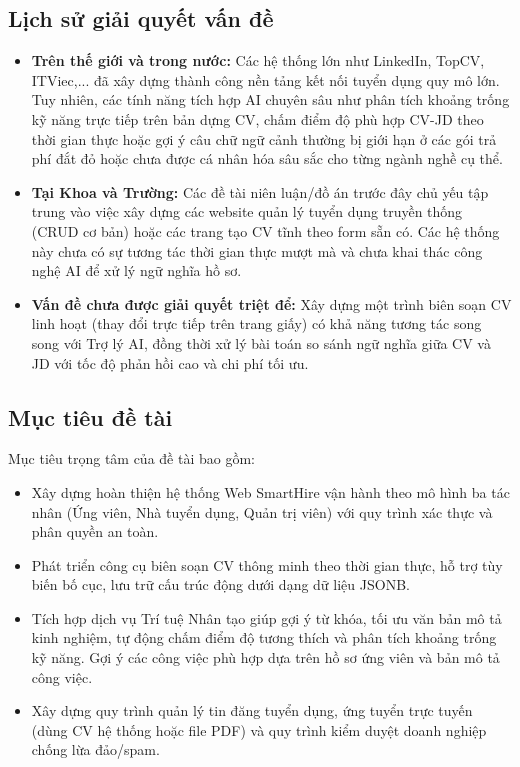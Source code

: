 \subsection{Lịch sử giải quyết vấn đề}
\begin{itemize}
    \item \textbf{Trên thế giới và trong nước:} Các hệ thống lớn như LinkedIn, TopCV, ITViec,... đã xây dựng thành công nền tảng kết nối tuyển dụng quy mô lớn. Tuy nhiên, các tính năng tích hợp AI chuyên sâu như phân tích khoảng trống kỹ năng trực tiếp trên bản dựng CV, chấm điểm độ phù hợp CV-JD theo thời gian thực hoặc gợi ý câu chữ ngữ cảnh thường bị giới hạn ở các gói trả phí đắt đỏ hoặc chưa được cá nhân hóa sâu sắc cho từng ngành nghề cụ thể.
    \item \textbf{Tại Khoa và Trường:} Các đề tài niên luận/đồ án trước đây chủ yếu tập trung vào việc xây dựng các website quản lý tuyển dụng truyền thống (CRUD cơ bản) hoặc các trang tạo CV tĩnh theo form sẵn có. Các hệ thống này chưa có sự tương tác thời gian thực mượt mà và chưa khai thác công nghệ AI để xử lý ngữ nghĩa hồ sơ.
    \item \textbf{Vấn đề chưa được giải quyết triệt để:} Xây dựng một trình biên soạn CV linh hoạt (thay đổi trực tiếp trên trang giấy) có khả năng tương tác song song với Trợ lý AI, đồng thời xử lý bài toán so sánh ngữ nghĩa giữa CV và JD với tốc độ phản hồi cao và chi phí tối ưu.
\end{itemize}

\subsection{Mục tiêu đề tài}
Mục tiêu trọng tâm của đề tài bao gồm:
\begin{itemize}
    \item Xây dựng hoàn thiện hệ thống Web SmartHire vận hành theo mô hình ba tác nhân (Ứng viên, Nhà tuyển dụng, Quản trị viên) với quy trình xác thực và phân quyền an toàn.
    \item Phát triển công cụ biên soạn CV thông minh theo thời gian thực, hỗ trợ tùy biến bố cục, lưu trữ cấu trúc động dưới dạng dữ liệu JSONB.
    \item Tích hợp dịch vụ Trí tuệ Nhân tạo giúp gợi ý từ khóa, tối ưu văn bản mô tả kinh nghiệm, tự động chấm điểm độ tương thích và phân tích khoảng trống kỹ năng. Gợi ý các công việc phù hợp dựa trên hồ sơ ứng viên và bản mô tả công việc.
    \item Xây dựng quy trình quản lý tin đăng tuyển dụng, ứng tuyển trực tuyến (dùng CV hệ thống hoặc file PDF) và quy trình kiểm duyệt doanh nghiệp chống lừa đảo/spam.
\end{itemize}

